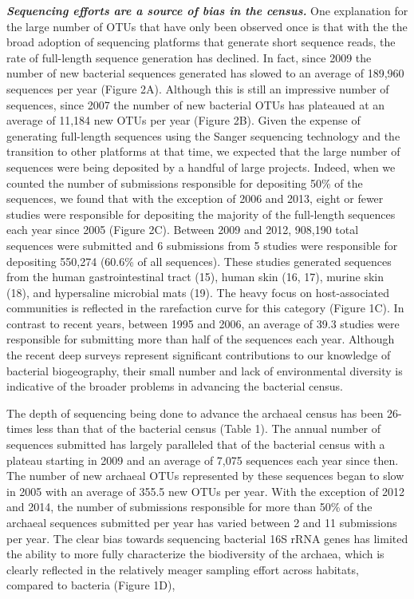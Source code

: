 \documentclass[11pt,]{article}
\begin{document}
\textbf{\emph{Sequencing efforts are a source of bias in the census.}}
One explanation for the large number of OTUs that have only been
observed once is that with the the broad adoption of sequencing
platforms that generate short sequence reads, the rate of full-length
sequence generation has declined. In fact, since 2009 the number of new
bacterial sequences generated has slowed to an average of 189,960
sequences per year (Figure 2A). Although this is still an impressive
number of sequences, since 2007 the number of new bacterial OTUs has
plateaued at an average of 11,184 new OTUs per year (Figure 2B). Given
the expense of generating full-length sequences using the Sanger
sequencing technology and the transition to other platforms at that
time, we expected that the large number of sequences were being
deposited by a handful of large projects. Indeed, when we counted the
number of submissions responsible for depositing 50\% of the sequences,
we found that with the exception of 2006 and 2013, eight or fewer
studies were responsible for depositing the majority of the full-length
sequences each year since 2005 (Figure 2C). Between 2009 and 2012,
908,190 total sequences were submitted and 6 submissions from 5 studies
were responsible for depositing 550,274 (60.6\% of all sequences). These
studies generated sequences from the human gastrointestinal tract (15),
human skin (16, 17), murine skin (18), and hypersaline microbial mats
(19). The heavy focus on host-associated communities is reflected in the
rarefaction curve for this category (Figure 1C). In contrast to recent
years, between 1995 and 2006, an average of 39.3 studies were
responsible for submitting more than half of the sequences each year.
Although the recent deep surveys represent significant contributions to
our knowledge of bacterial biogeography, their small number and lack of
environmental diversity is indicative of the broader problems in
advancing the bacterial census.

The depth of sequencing being done to advance the archaeal census has
been 26-times less than that of the bacterial census (Table 1). The
annual number of sequences submitted has largely paralleled that of the
bacterial census with a plateau starting in 2009 and an average of 7,075
sequences each year since then. The number of new archaeal OTUs
represented by these sequences began to slow in 2005 with an average of
355.5 new OTUs per year. With the exception of 2012 and 2014, the number
of submissions responsible for more than 50\% of the archaeal sequences
submitted per year has varied between 2 and 11 submissions per year. The
clear bias towards sequencing bacterial 16S rRNA genes has limited the
ability to more fully characterize the biodiversity of the archaea,
which is clearly reflected in the relatively meager sampling effort
across habitats, compared to bacteria (Figure 1D),
\end{document}
